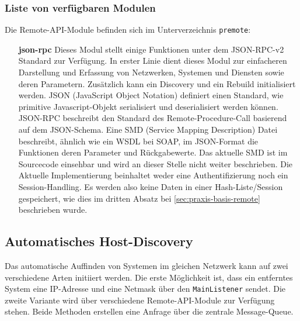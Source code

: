 \subsubsection{Liste von verf\"ugbaren Modulen} \label{sec:praxis-basis-remote-list}
Die Remote-API-Module befinden sich im Unterverzeichnis \texttt{premote}:
\begin{itemize}
 \item[\textbf{json-rpc}] Dieses Modul stellt einige Funktionen unter dem JSON-RPC-v2 \cite{json-rpc} Standard zur Verf\"ugung. In erster Linie dient dieses Modul zur einfacheren Darstellung und Erfassung von Netzwerken, Systemen und Diensten sowie deren Parametern. Zus\"atzlich kann ein Discovery und ein Rebuild initialisiert werden. JSON \cite{json} (JavaScript Object Notation) definiert einen Standard, wie primitive Javascript-Objekt serialisiert und deserialisiert werden k\"onnen. JSON-RPC beschreibt den Standard des Remote-Procedure-Call basierend auf dem JSON-Schema. Eine SMD \cite{json-smd} (Service Mapping Description) Datei beschreibt, \"ahnlich wie ein WSDL bei SOAP, im JSON-Format die Funktionen deren Parameter und R\"uckgabewerte. Das aktuelle SMD ist im Sourcecode einsehbar und wird an dieser Stelle nicht weiter beschrieben. Die Aktuelle Implementierung beinhaltet weder eine Authentifizierung noch ein Session-Handling. Es werden also keine Daten in einer Hash-Liste/Session gespeichert, wie dies im dritten Absatz bei \ref{sec:praxis-basis-remote} beschrieben wurde.
\end{itemize}


\subsection{Automatisches Host-Discovery} \label{sec:praxis-basis-discovery}
Das automatische Auffinden von Systemen im gleichen Netzwerk kann auf zwei verschiedene Arten initiiert werden. Die erste M\"oglichkeit ist, dass ein entferntes System eine IP-Adresse und eine Netmask \"uber den \texttt{MainListener} sendet. Die zweite Variante wird \"uber verschiedene Remote-API-Module zur Verf\"ugung stehen. Beide Methoden erstellen eine Anfrage \"uber die zentrale Message-Queue.


